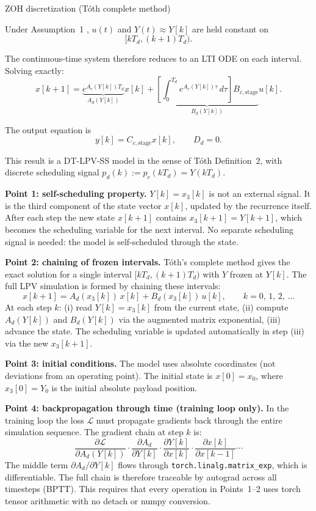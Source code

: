 \documentclass[11pt]{article}
\newcounter{derivstep}
\newenvironment{derivationstep}[1]
{
    \refstepcounter{derivstep}
    \begin{stepbox}{#1}
}
{
    \end{stepbox}
}
\begin{document}
\begin{derivationstep}{ZOH discretization (Tóth complete method)}

Under Assumption~1 \cite{toth2010}, \(u(t)\) and \(Y(t)\approx Y[k]\) are held constant on
\[
[kT_d,(k+1)T_d).
\]

The continuous-time system therefore reduces to an LTI ODE on each interval. Solving exactly:
\[
x[k+1]
=
\underbrace{e^{A_c(Y[k])T_d}}_{A_d(Y[k])}x[k]
+
\underbrace{\left[\int_0^{T_d} e^{A_c(Y[k])\tau}\, d\tau\right] B_{c,\text{stage}}}_{B_d(Y[k])}u[k].
\]

The output equation is
\[
y[k] = C_{c,\text{stage}}x[k],
\qquad
D_d = 0.
\]

This result is a DT-LPV-SS model in the sense of Tóth \cite{toth2010} Definition~2, with
discrete scheduling signal $p_d(k) := p_c(kT_d) = Y(kT_d)$.

\medskip
\textbf{Point 1: self-scheduling property.}
$Y[k] = x_3[k]$ is not an external signal. It is the third component of the state vector
$x[k]$, updated by the recurrence itself. After each step the new state $x[k+1]$ contains
$x_3[k+1] = Y[k+1]$, which becomes the scheduling variable for the next interval. No
separate scheduling signal is needed: the model is self-scheduled through the state.

\medskip
\textbf{Point 2: chaining of frozen intervals.}
Tóth's complete method gives the exact solution for a single interval $[kT_d, (k+1)T_d)$
with $Y$ frozen at $Y[k]$. The full LPV simulation is formed by chaining these intervals:
\[
    x[k+1] = A_d(x_3[k])\,x[k] + B_d(x_3[k])\,u[k], \qquad k = 0,\,1,\,2,\,\ldots
\]
At each step $k$: (i) read $Y[k] = x_3[k]$ from the current state, (ii) compute
$A_d(Y[k])$ and $B_d(Y[k])$ via the augmented matrix exponential, (iii) advance the state.
The scheduling variable is updated automatically in step (iii) via the new $x_3[k+1]$.

\medskip
\textbf{Point 3: initial conditions.}
The model uses absolute coordinates (not deviations from an operating point). The initial
state is $x[0] = x_0$, where $x_3[0] = Y_0$ is the initial absolute payload position.

\medskip
\textbf{Point 4: backpropagation through time (training loop only).}
In the training loop the loss $\mathcal{L}$ must propagate gradients back through the
entire simulation sequence. The gradient chain at step $k$ is:
\[
    \frac{\partial \mathcal{L}}{\partial A_d(Y[k])} \cdot
    \frac{\partial A_d}{\partial Y[k]} \cdot
    \frac{\partial Y[k]}{\partial x[k]} \cdot
    \frac{\partial x[k]}{\partial x[k-1]} \cdots
\]
The middle term $\partial A_d / \partial Y[k]$ flows through
\texttt{torch.linalg.matrix\_exp}, which is differentiable. The full chain is therefore
traceable by autograd across all timesteps (BPTT). This requires that every operation in
Points~1--2 uses torch tensor arithmetic with no detach or numpy conversion.


\end{derivationstep}
\end{document}
